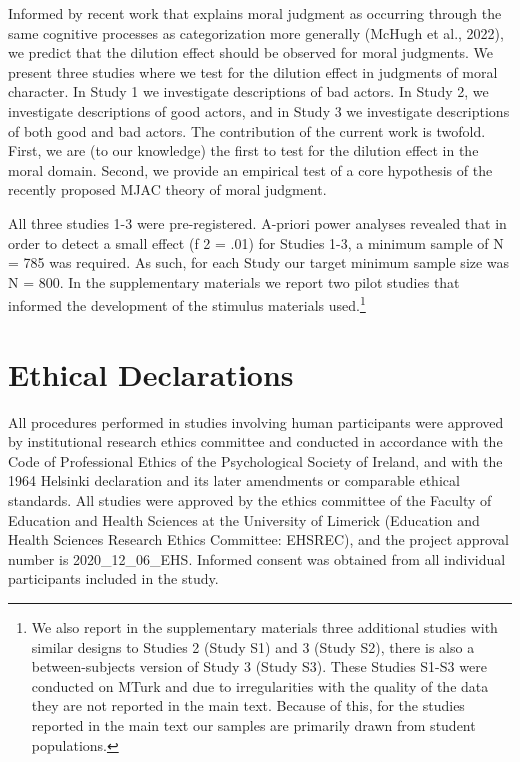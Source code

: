 \documentclass[
  man,floatsintext]{apa7}
\begin{document}
Informed by recent work that explains moral judgment as occurring through the same cognitive processes as categorization more generally (McHugh et al., 2022), we predict that the dilution effect should be observed for moral judgments. We present three studies where we test for the dilution effect in judgments of moral character. In Study 1 we investigate descriptions of bad actors. In Study 2, we investigate descriptions of good actors, and in Study 3 we investigate descriptions of both good and bad actors. The contribution of the current work is twofold. First, we are (to our knowledge) the first to test for the dilution effect in the moral domain. Second, we provide an empirical test of a core hypothesis of the recently proposed MJAC theory of moral judgment.

All three studies 1-3 were pre-registered. A-priori power analyses revealed that in order to detect a small effect (f 2 = .01) for Studies 1-3, a minimum sample of N = 785 was required. As such, for each Study our target minimum sample size was N = 800. In the supplementary materials we report two pilot studies that informed the development of the stimulus materials used.\footnote{We also report in the supplementary materials three additional studies with similar designs to Studies 2 (Study S1) and 3 (Study S2), there is also a between-subjects version of Study 3 (Study S3). These Studies S1-S3 were conducted on MTurk and due to irregularities with the quality of the data they are not reported in the main text. Because of this, for the studies reported in the main text our samples are primarily drawn from student populations.}

\section{Ethical Declarations}\label{ethical-declarations}

All procedures performed in studies involving human participants were approved by institutional research ethics committee and conducted in accordance with the Code of Professional Ethics of the Psychological Society of Ireland, and with the 1964 Helsinki declaration and its later amendments or comparable ethical standards. All studies were approved by the ethics committee of the Faculty of Education and Health Sciences at the University of Limerick (Education and Health Sciences Research Ethics Committee: EHSREC), and the project approval number is 2020\_12\_06\_EHS. Informed consent was obtained from all individual participants included in the study.
\end{document}
